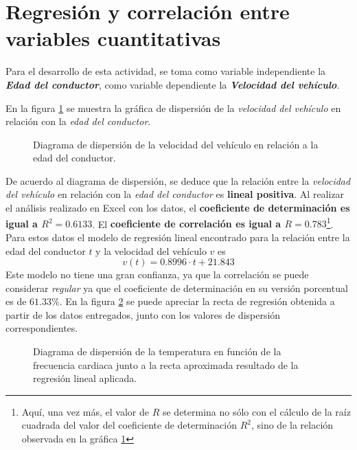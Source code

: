 \section*{Regresión y correlación entre variables cuantitativas}
Para el desarrollo de esta actividad, se toma como variable independiente la \textbf{\emph{Edad del conductor}}, como variable dependiente la \textbf{\emph{Velocidad del vehículo}}.\par
En la figura \ref{fig:scatterPlotExercise} se muestra la gráfica de dispersión de la \emph{velocidad del vehículo} en relación con la \emph{edad del conductor}.
\begin{figure}[!ht]
    \centering
    
    \caption{\footnotesize{Diagrama de dispersión de la velocidad del vehículo en relación a la edad del conductor.}}
    \label{fig:scatterPlotExercise}
\end{figure}
De acuerdo al diagrama de dispersión, se deduce que la relación entre la \emph{velocidad del vehículo} en relación con la \emph{edad del conductor} es \textbf{lineal positiva}.
Al realizar el análisis realizado en Excel con los datos, el \textbf{coeficiente de determinación es igual a $R^{2}=0.6133$}. El \textbf{coeficiente de correlación es igual a $R=0.783$}\footnote[1]{Aquí, una vez más, el valor de $R$ se determina no sólo con el cálculo de la raíz cuadrada del valor del coeficiente de determinación $R^{2}$, sino de la relación observada en la gráfica \ref{fig:scatterPlotExercise}}. Para estos datos el modelo de regresión lineal encontrado para la relación entre la edad del conductor $t$ y la velocidad del vehículo $v$ es
\begin{equation}
    \label{eq:modelo1}
    v(t) = 0.8996\cdot t + 21.843
\end{equation}
Este modelo no tiene una gran confianza, ya que la correlación se puede considerar \emph{regular} ya que el coeficiente de determinación en su versión porcentual es de $61.33\%$. En la figura \ref{fig:scatterPlotExerciseb} se puede apreciar la recta de regresión obtenida a partir de los datos entregados, junto con los valores de dispersión correspondientes.\par
\begin{figure}[!ht]
    \centering
    
    \caption{\footnotesize{Diagrama de dispersión de la temperatura en función de la frecuencia cardiaca junto a la recta aproximada resultado de la regresión lineal aplicada.}}
    \label{fig:scatterPlotExerciseb}
\end{figure}
